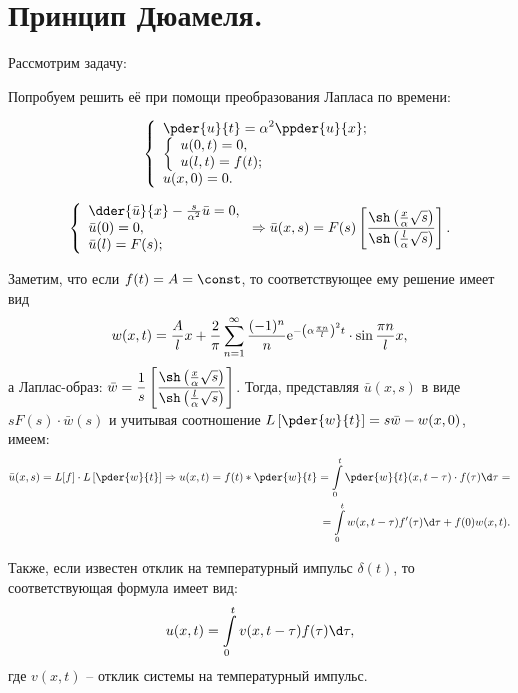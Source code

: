\chapter{Принцип Дюамеля.}

\begin{minipage}{.55\textwidth}
    Рассмотрим задачу:

    Попробуем решить её при помощи преобразования Лапласа по времени:
\end{minipage}
\hfill
\begin{minipage}{.4\textwidth}
    \[
        \left\{ \begin{array}{l}
            \ds \pder{u}{t} = \alpha^2 \ppder{u}{x}; \\
                \left\{ \begin{array}{l}
                    u(0, t) = 0, \\
                    u(l, t) = f(t); 
                \end{array} \right. \\
            u(x, 0) = 0.
        \end{array} \right.
    \]
\end{minipage}

\[
    \left\{ \begin{array}{l}
        \dder{\bar{u}}{x} - \frac{s}{\alpha^2}\bar{u} = 0, \\
        \bar{u}(0) = 0, \\
        \bar{u}(l) = F(s);
    \end{array} \right.
    \Rightarrow
    \bar{u}(x, s) = F(s)\left[\frac{\sh\left(\frac{x}{\alpha}\sqrt{s}\right)}
    {\sh\left(\frac{l}{\alpha}\sqrt{s}\right)}\right].
\]

Заметим, что если \( f(t) = A = \const \), то соответствующее ему решение имеет
вид
\[
    w(x, t) = \frac{A}{l}x + \frac{2}{\pi}\sum\limits_{n=1}^\infty
    \frac{(-1)^n}{n}\mathrm{e}^{-\left(\alpha\frac{\pi n}{l}\right)^2t}\cdot
    \sin\frac{\pi n}{l}x,
\]
а Лаплас-образ: \( \ds \bar{w} = \frac{1}{s}\left[\frac{\sh\left(
\frac{x}{\alpha}\sqrt{s}\right)}{\sh\left(\frac{l}{\alpha}\sqrt{s}\right)}
\right] \).
Тогда, представляя \( \bar{u}(x, s) \) в виде \( sF(s)\cdot\bar{w}(s) \) и
учитывая соотношение \( \ds L\left[\pder{w}{t}\right] = s\bar{w} - w(x, 0) \),
имеем:
\begin{align*}
    \bar{u}(x, s) = L[f]\cdot L\left[\pder{w}{t}\right] \Rightarrow
    u(x, t) = f(t)*\pder{w}{t} = \int\limits_0^t \pder{w}{t}(x, t-\tau)\cdot
    f(\tau)\d\tau = \\
    = \int\limits_0^t w(x, t - \tau)f'(\tau)\d\tau + f(0)w(x, t).
\end{align*}

Также, если известен отклик на температурный импульс \( \delta(t) \), то
соответствующая формула имеет вид:
\[
    u(x, t) = \int\limits_0^t v(x, t - \tau)f(\tau)\d\tau,
\]
где \( v(x, t) \) -- отклик системы на температурный импульс.

\newpage
